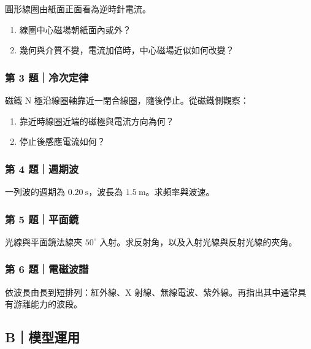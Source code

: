 \documentclass[11pt,a4paper]{article}
\providecommand{\tightlist}{%
  \setlength{\itemsep}{0pt}\setlength{\parskip}{0pt}}
\begin{document}
圓形線圈由紙面正面看為逆時針電流。

\begin{enumerate}
\def\labelenumi{\arabic{enumi}.}
\tightlist
\item
  線圈中心磁場朝紙面內或外？
\item
  幾何與介質不變，電流加倍時，中心磁場近似如何改變？
\end{enumerate}

\subsubsection{第 3 題｜冷次定律}\label{ux7b2c-3-ux984cux51b7ux6b21ux5b9aux5f8b}

磁鐵 N 極沿線圈軸靠近一閉合線圈，隨後停止。從磁鐵側觀察：

\begin{enumerate}
\def\labelenumi{\arabic{enumi}.}
\tightlist
\item
  靠近時線圈近端的磁極與電流方向為何？
\item
  停止後感應電流如何？
\end{enumerate}

\subsubsection{第 4 題｜週期波}\label{ux7b2c-4-ux984cux9031ux671fux6ce2}

一列波的週期為 \(0.20\ \mathrm s\)，波長為 \(1.5\ \mathrm m\)。求頻率與波速。

\subsubsection{第 5 題｜平面鏡}\label{ux7b2c-5-ux984cux5e73ux9762ux93e1}

光線與平面鏡法線夾 \(50^\circ\) 入射。求反射角，以及入射光線與反射光線的夾角。

\subsubsection{第 6 題｜電磁波譜}\label{ux7b2c-6-ux984cux96fbux78c1ux6ce2ux8b5c}

依波長由長到短排列：紅外線、X 射線、無線電波、紫外線。再指出其中通常具有游離能力的波段。

\subsection{B｜模型運用}\label{bux6a21ux578bux904bux7528}
\end{document}
